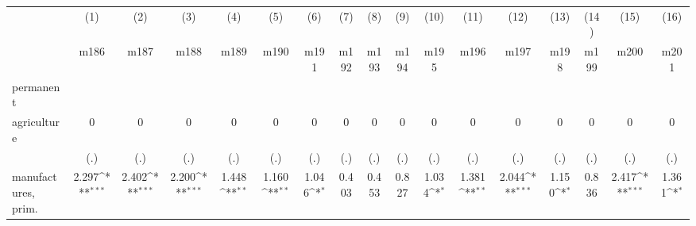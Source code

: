 {
\def\sym#1{\ifmmode^{#1}\else\(^{#1}\)\fi}
\begin{tabular}{l*{16}{c}}
\hline\hline
                    &\multicolumn{1}{c}{(1)}&\multicolumn{1}{c}{(2)}&\multicolumn{1}{c}{(3)}&\multicolumn{1}{c}{(4)}&\multicolumn{1}{c}{(5)}&\multicolumn{1}{c}{(6)}&\multicolumn{1}{c}{(7)}&\multicolumn{1}{c}{(8)}&\multicolumn{1}{c}{(9)}&\multicolumn{1}{c}{(10)}&\multicolumn{1}{c}{(11)}&\multicolumn{1}{c}{(12)}&\multicolumn{1}{c}{(13)}&\multicolumn{1}{c}{(14)}&\multicolumn{1}{c}{(15)}&\multicolumn{1}{c}{(16)}\\
                    &\multicolumn{1}{c}{m186}&\multicolumn{1}{c}{m187}&\multicolumn{1}{c}{m188}&\multicolumn{1}{c}{m189}&\multicolumn{1}{c}{m190}&\multicolumn{1}{c}{m191}&\multicolumn{1}{c}{m192}&\multicolumn{1}{c}{m193}&\multicolumn{1}{c}{m194}&\multicolumn{1}{c}{m195}&\multicolumn{1}{c}{m196}&\multicolumn{1}{c}{m197}&\multicolumn{1}{c}{m198}&\multicolumn{1}{c}{m199}&\multicolumn{1}{c}{m200}&\multicolumn{1}{c}{m201}\\
\hline
permanent           &                     &                     &                     &                     &                     &                     &                     &                     &                     &                     &                     &                     &                     &                     &                     &                     \\
agriculture         &           0         &           0         &           0         &           0         &           0         &           0         &           0         &           0         &           0         &           0         &           0         &           0         &           0         &           0         &           0         &           0         \\
                    &         (.)         &         (.)         &         (.)         &         (.)         &         (.)         &         (.)         &         (.)         &         (.)         &         (.)         &         (.)         &         (.)         &         (.)         &         (.)         &         (.)         &         (.)         &         (.)         \\
[1em]
manufactures, prim. &       2.297\sym{***}&       2.402\sym{***}&       2.200\sym{***}&       1.448\sym{**} &       1.160\sym{**} &       1.046\sym{*}  &       0.403         &       0.453         &       0.827         &       1.034\sym{*}  &       1.381\sym{**} &       2.044\sym{***}&       1.150\sym{*}  &       0.836         &       2.417\sym{***}&       1.361\sym{*}  \\

\end{tabular}}
